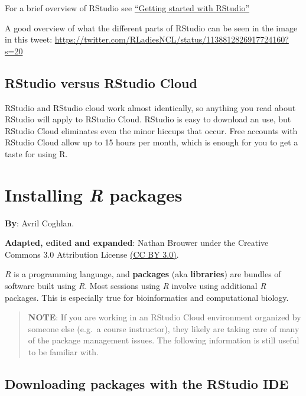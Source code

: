 \documentclass[
]{book}
\begin{document}
For a brief overview of RStudio see \href{https://brouwern.github.io/BOOK_R_Ecological_Data_Science/getting-started-with-rstudio.html}{``Getting started with RStudio''}

A good overview of what the different parts of RStudio can be seen in the image in this tweet: \url{https://twitter.com/RLadiesNCL/status/1138812826917724160?s=20}

\hypertarget{rstudio-versus-rstudio-cloud}{%
\section{RStudio versus RStudio Cloud}\label{rstudio-versus-rstudio-cloud}}

RStudio and RStudio cloud work almost identically, so anything you read about RStudio will apply to RStudio Cloud. RStudio is easy to download an use, but RStudio Cloud eliminates even the minor hiccups that occur. Free accounts with RStudio Cloud allow up to 15 hours per month, which is enough for you to get a taste for using R.

\hypertarget{installing-r-packages}{%
\chapter{\texorpdfstring{Installing \emph{R} packages}{Installing R packages}}\label{installing-r-packages}}

\textbf{By}: Avril Coghlan.

\textbf{Adapted, edited and expanded}: Nathan Brouwer under the Creative Commons 3.0 Attribution License \href{https://creativecommons.org/licenses/by/3.0/}{(CC BY 3.0)}.

\emph{R} is a programming language, and \textbf{packages} (aka \textbf{libraries}) are bundles of software built using \emph{R}. Most sessions using \emph{R} involve using additional \emph{R} packages. This is especially true for bioinformatics and computational biology.

\begin{quote}
\textbf{NOTE}: If you are working in an RStudio Cloud environment organized by someone else (e.g.~a course instructor), they likely are taking care of many of the package management issues. The following information is still useful to be familiar with.
\end{quote}

\hypertarget{downloading-packages-with-the-rstudio-ide}{%
\section{Downloading packages with the RStudio IDE}\label{downloading-packages-with-the-rstudio-ide}}
\end{document}
